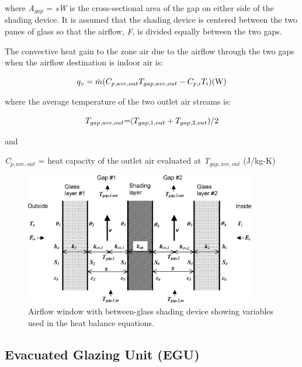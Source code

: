 where \emph{A\(_{gap}\)} = \emph{sW} is the cross-sectional area of the gap on either side of the shading device. It is assumed that the shading device is centered between the two panes of glass so that the airflow, \emph{F}, is divided equally between the two gaps.

The convective heat gain to the zone air due to the airflow through the two gaps when the airflow destination is indoor air is:

\begin{equation}
{q_v} = \dot m({C_{p,ave,out}}{T_{gap,ave,out}} - {C_{p,i}}{T_i}{\rm{)      (W)}}
\end{equation}

where the average temperature of the two outlet air streams is:

\begin{equation}
{T_{gap,ave,out}}{\rm{ =  }}({T_{gap,1,out}} + {T_{gap,2,out}})/2
\end{equation}

and

\emph{C\(_{p,ave,out}\)} = heat capacity of the outlet air evaluated at \emph{T\(_{gap,ave,out}\)} (J/kg-K)

\begin{figure}[hbtp] %
\centering
\includegraphics[width=0.9\textwidth, height=0.9\textheight, keepaspectratio=true]{media/image1763.png}
\caption{Airflow window with between-glass shading device showing variables used in the heat balance equations. \protect \label{fig:airflow-window-with-between-glass-shading}}
\end{figure}

\subsection{Evacuated Glazing Unit (EGU)}\label{evacuated-glazing-unit-egu}

